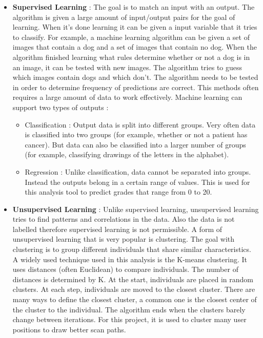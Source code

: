 \documentclass[a4paper,11pt]{report}
\numberwithin{figure}{section} %
\begin{document}
    \begin{itemize}
        \item[\textbullet] \textbf{Supervised Learning} : The goal is to match an input with an output.
        The algorithm is given a large amount of input/output pairs for the goal of learning.
        When it's done learning it can be given a input variable that it tries to classify.
        For example, a machine learning algorithm can be given a set of images that contain a dog and a set of images that contain no dog.
        When the algorithm finished learning what rules determine whether or not a dog is in an image, it can be tested with new images.
        The algorithm tries to guess which images contain dogs and which don't.
        The algorithm needs to be tested in order to determine frequency of predictions are correct.
        This methods often requires a large amount of data to work effectively.
        Machine learning can support two types of outputs :
        \begin{itemize}
            \item Classification : Output data is split into different groups.
            Very often data is classified into two groups (for example, whether or not a patient has cancer).
            But data can also be classified into a larger number of groups (for example, classifying drawings of the letters in the alphabet).
            \item Regression : Unlike classification, data cannot be separated into groups.
            Instead the outputs belong in a certain range of values.
            This is used for this analysis tool to predict grades that range from 0 to 20.
        \end{itemize}
        \item[\textbullet] \textbf{Unsupervised Learning} : Unlike supervised learning, unsupervised learning tries to find patterns and correlations in the data.
        Also the data is not labelled therefore supervised learning is not permissible.
        A form of unsupervised learning that is very popular is clustering.
        The goal with clustering is to group different individuals that share similar characteristics.
        A widely used technique used in this analysis is the K-means clustering.
        It uses distances (often Euclidean) to compare individuals.
        The number of distances is determined by K.
        At the start, individuals are placed in random clusters.
        At each step, individuals are moved to the closest cluster.
        There are many ways to define the closest cluster, a common one is the closest center of the cluster to the individual.
        The algorithm ends when the clusters barely change between iterations.
        For this project, it is used to cluster many user positions to draw better scan paths.
    \end{itemize}
\end{document}
